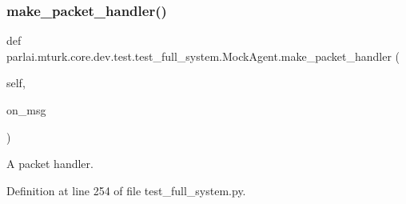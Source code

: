 \subsubsection{\texorpdfstring{make\+\_\+packet\+\_\+handler()}{make\_packet\_handler()}}
{\footnotesize\ttfamily def parlai.\+mturk.\+core.\+dev.\+test.\+test\+\_\+full\+\_\+system.\+Mock\+Agent.\+make\+\_\+packet\+\_\+handler (\begin{DoxyParamCaption}\item[{}]{self,  }\item[{}]{on\+\_\+msg }\end{DoxyParamCaption})}

\begin{DoxyVerb}A packet handler.
\end{DoxyVerb}
 

Definition at line 254 of file test\+\_\+full\+\_\+system.\+py.



